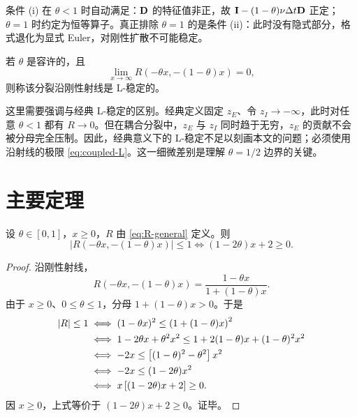 条件 (i) 在 $\theta<1$ 时自动满足：${\mathbf{D}}$ 的特征值非正，故 ${\mathbf{I}}-(1-\theta)\nu\Delta t{\mathbf{D}}$ 正定；$\theta=1$ 时约定为恒等算子。真正排除 $\theta=1$ 的是条件 (ii)：此时没有隐式部分，格式退化为显式 Euler，对刚性扩散不可能稳定。

\begin{definition}[沿刚性射线的 L-稳定]
  若 $\theta$ 是容许的，且
  \begin{equation}
    \lim_{x\to\infty}R\left(-\theta x,-(1-\theta)x\right)=0,
    \label{eq:coupled-L}
  \end{equation}
  则称该分裂沿刚性射线是 L-稳定的。
\end{definition}

这里需要强调与经典 L-稳定的区别。经典定义固定 $z_E$、令 $z_I\to-\infty$，此时对任意 $\theta<1$ 都有 $R\to0$。但在耦合分裂中，$z_E$ 与 $z_I$ 同时趋于无穷，$z_E$ 的贡献不会被分母完全压制。因此，经典意义下的 L-稳定不足以刻画本文的问题；必须使用沿射线的极限 \eqref{eq:coupled-L}。这一细微差别是理解 $\theta=1/2$ 边界的关键。

\section{主要定理}
\label{sec:main-theorem}

\begin{theorem}[纯耗散情形的精确稳定性条件]
  \label{thm:main}
  设 $\theta\in[0,1]$，$x\ge0$，$R$ 由 \eqref{eq:R-general} 定义。则
  \begin{equation}
    \left|R\left(-\theta x,-(1-\theta)x\right)\right|\le1
    \iff
    (1-2\theta)x+2\ge0.
    \label{eq:main-ineq}
  \end{equation}
\end{theorem}

\begin{proof}
  沿刚性射线，
  \begin{equation}
    R\left(-\theta x,-(1-\theta)x\right)
    =\frac{1-\theta x}{1+(1-\theta)x}.
    \label{eq:R-ray}
  \end{equation}
  由于 $x\ge0$、$0\le\theta\le1$，分母 $1+(1-\theta)x>0$。于是
  \begin{align}
    |R|\le1
    &\iff (1-\theta x)^2\le\left(1+(1-\theta)x\right)^2 \notag\\
    &\iff 1-2\theta x+\theta^2x^2
    \le1+2(1-\theta)x+(1-\theta)^2x^2 \notag\\
    &\iff -2x\le\left[(1-\theta)^2-\theta^2\right]x^2 \notag\\
    &\iff -2x\le(1-2\theta)x^2 \notag\\
    &\iff x\left[(1-2\theta)x+2\right]\ge0. \label{eq:proof-last}
  \end{align}
  因 $x\ge0$，上式等价于 $(1-2\theta)x+2\ge0$。证毕。
\end{proof}


